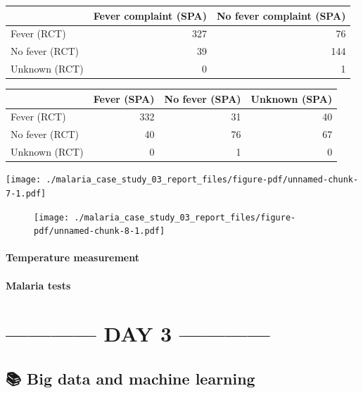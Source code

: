 \documentclass[
  letterpaper,
  DIV=11,
  numbers=noendperiod,
  oneside]{scrreprt}
\begin{document}
\begin{longtable}[]{@{}lrr@{}}
\toprule()
& Fever complaint (SPA) & No fever complaint (SPA) \\
\midrule()
\endhead
Fever (RCT) & 327 & 76 \\
No fever (RCT) & 39 & 144 \\
Unknown (RCT) & 0 & 1 \\
\bottomrule()
\end{longtable}

\begin{longtable}[]{@{}lrrr@{}}
\toprule()
& Fever (SPA) & No fever (SPA) & Unknown (SPA) \\
\midrule()
\endhead
Fever (RCT) & 332 & 31 & 40 \\
No fever (RCT) & 40 & 76 & 67 \\
Unknown (RCT) & 0 & 1 & 0 \\
\bottomrule()
\end{longtable}

\texttt{[image: ./malaria\_case\_study\_03\_report\_files/figure-pdf/unnamed-chunk-7-1.pdf]}

\begin{figure}

\texttt{[image: ./malaria\_case\_study\_03\_report\_files/figure-pdf/unnamed-chunk-8-1.pdf]}

\end{figure}

\hypertarget{temperature-measurement-1}{%
\subsection{Temperature measurement}\label{temperature-measurement-1}}

\hypertarget{malaria-tests-2}{%
\subsection{Malaria tests}\label{malaria-tests-2}}

\part{------------ DAY 3 ------------}

\hypertarget{big-data-and-machine-learning}{%
\chapter{\texorpdfstring{{📚} Big data and machine
learning}{📚 Big data and machine learning}}\label{big-data-and-machine-learning}}
\end{document}
